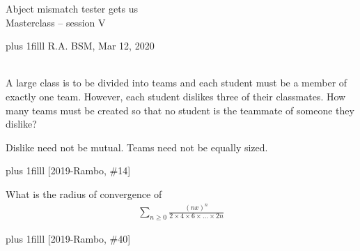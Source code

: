 \documentclass[onepage, 12pt]{beamer}
\author{RA}
\def\Bottom#1{\vskip 0pt plus 1filll #1}
\begin{document}


\begin{frame}[plain,t]
	\begin{center}
        \vspace{1cm}
		Abject mismatch tester gets us
		\\
		{\small\color{gray} Masterclass -- session V}

		\vspace{1cm}

	\end{center}
	
	
	\Bottom{
		\scriptsize
		R.A.
		\hfill
		BSM, Mar 12, 2020
		\\ {\ }
	}
\end{frame}







\begin{frame}[t]{}{}
	 A large class is to be divided into teams and each student must be a member of exactly one team. However, each student dislikes three of their classmates. 
	 How many teams must be created so that no student is the teammate of someone they dislike?
	 
	 Dislike need not be mutual. Teams need not be equally sized.

	\Bottom{%
		[2019-Rambo, \#14]
	}
\end{frame}


\begin{frame}[t]{}{}
	What is the radius of convergence of
	\begin{align*}
		\sum_{n \geq 0}
		\frac{
			(n x)^n
		}{
			2 \times 4 \times 6 \times \dots \times 2n
		}
	\end{align*}

    
	\Bottom{%
		[2019-Rambo, \#40]
	}
\end{frame}
\end{document}
